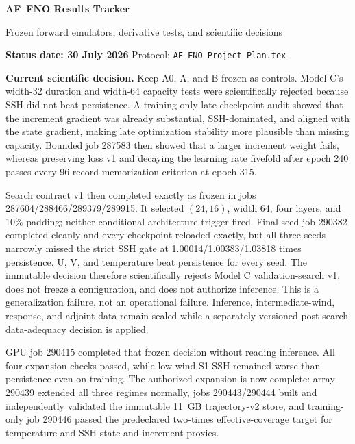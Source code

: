 \documentclass[11pt]{article}
\begin{document}
\begin{center}
  {\sffamily\bfseries\color{navy}\fontsize{24}{28}\selectfont
  AF--FNO Results Tracker\par}
  \vspace{0.10in}
  {\large Frozen forward emulators, derivative tests, and scientific decisions\par}
  \vspace{0.12in}
  {\color{graytext}\textbf{Status date: 30 July 2026} \quad
  Protocol: \texttt{AF\_FNO\_Project\_Plan.tex}}
\end{center}

\begingroup\color{graytext}
\textbf{Current scientific decision.}  Keep A0, A, and B frozen as controls.  Model C's
width-32 duration and width-64 capacity tests were scientifically rejected because SSH
did not beat persistence.  A training-only late-checkpoint audit showed that the
increment gradient was already substantial, SSH-dominated, and aligned with the state
gradient, making late optimization stability more plausible than missing capacity.
Bounded job 287583 then showed that a larger increment weight fails, whereas preserving
loss v1 and decaying the learning rate fivefold after epoch 240 passes every 96-record
memorization criterion at epoch 315.

Search contract v1 then completed exactly as frozen in jobs
287604/288466/289379/289915.  It selected \((24,16)\), width 64, four layers, and
10\% padding; neither conditional architecture trigger fired.  Final-seed job 290382
completed cleanly and every checkpoint reloaded exactly, but all three seeds narrowly
missed the strict SSH gate at 1.00014/1.00383/1.03818 times persistence.  U, V, and
temperature beat persistence for every seed.  The immutable decision therefore
scientifically rejects Model C validation-search v1, does not freeze a configuration,
and does not authorize inference.  This is a generalization failure, not an operational
failure.  Inference, intermediate-wind, response, and adjoint data remain sealed while
a separately versioned post-search data-adequacy decision is applied.

GPU job 290415 completed that frozen decision without reading inference.  All four
expansion checks passed, while low-wind S1 SSH remained worse than persistence even on
training.  The authorized expansion is now complete: array 290439 extended all three
regimes normally, jobs 290443/290444 built and independently validated the immutable
11~GB trajectory-v2 store, and training-only job 290446 passed the predeclared
two-times effective-coverage target for temperature and SSH state and increment
proxies.
\end{document}
